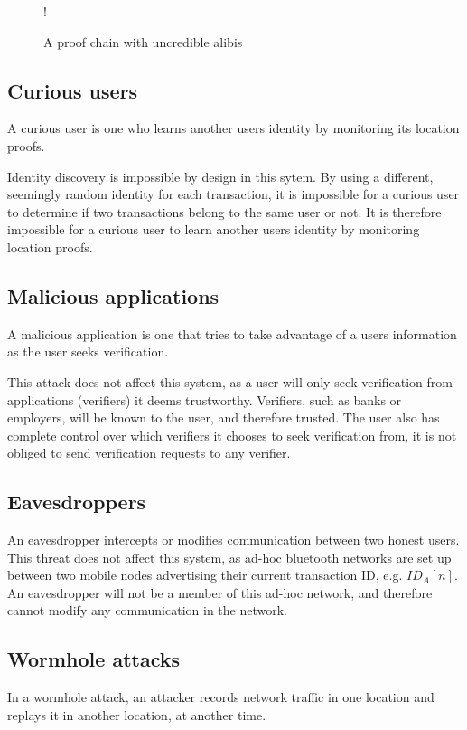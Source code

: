 \begin{figure}[H]
\begin{center}
\resizebox {0.5\columnwidth} {!} {}
\vspace{-3cm}
\caption{A proof chain with uncredible alibis}
\label{fig:uncredible_tree}
\end{center}
\end{figure}

\subsection{Curious users}
A curious user is one who learns another users identity by monitoring its location proofs.

Identity discovery is impossible by design in this sytem. By using a different, seemingly random identity for each transaction, it is impossible for a curious user to determine if two transactions belong to the same user or not. It is therefore impossible for a curious user to learn another users identity by monitoring location proofs.

\subsection{Malicious applications}
A malicious application is one that tries to take advantage of a users information as the user seeks verification.

This attack does not affect this system, as a user will only seek verification from applications (verifiers) it deems trustworthy. Verifiers, such as banks or employers, will be known to the user, and therefore trusted. The user also has complete control over which verifiers it chooses to seek verification from, it is not obliged to send verification requests to any verifier.

\subsection{Eavesdroppers}
An eavesdropper intercepts or modifies communication between two honest users. This threat does not affect this system, as ad-hoc bluetooth networks are set up between two mobile nodes advertising their current transaction ID, e.g. $ID_A[n]$. An eavesdropper will not be a member of this ad-hoc network, and therefore cannot modify any communication in the network.

\subsection{Wormhole attacks}
In a wormhole attack, an attacker records network traffic in one location and replays it in another location, at another time.

